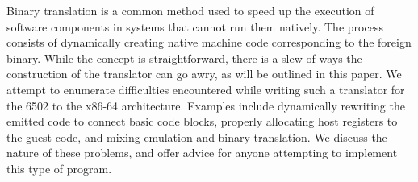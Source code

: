 Binary translation is a common method used to speed up the execution of
software components in systems that cannot run them natively.  The process
consists of dynamically creating native machine code corresponding to the
foreign binary.  While the concept is straightforward, there is a slew of ways
the construction of the translator can go awry, as will be outlined in this
paper.  We attempt to enumerate difficulties encountered while writing such a
translator for the 6502 to the x86-64 architecture.  Examples include
dynamically rewriting the emitted code to connect basic code blocks, properly
allocating host registers to the guest code, and mixing emulation and binary
translation.  We discuss the nature of these problems, and offer advice for
anyone attempting to implement this type of program.


